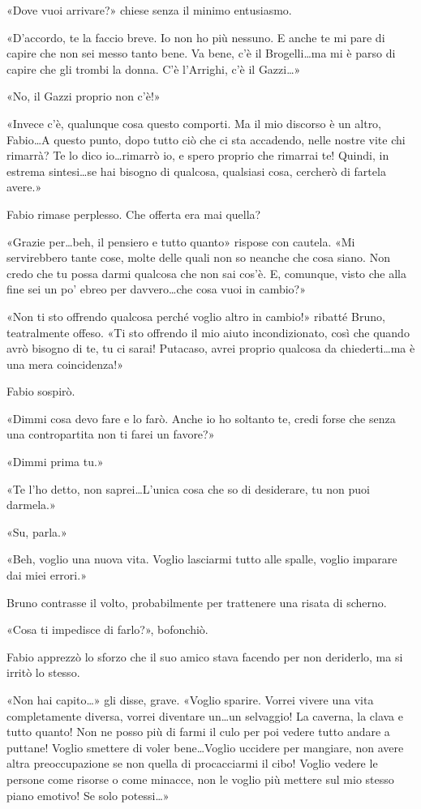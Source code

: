 «Dove vuoi arrivare?» chiese senza il minimo entusiasmo.

«D'accordo, te la faccio breve. Io non ho più nessuno. E anche te mi pare di capire che non sei messo tanto bene. Va bene, c'è il Brogelli\ldots ma mi è parso di capire che gli trombi la donna. C'è l'Arrighi, c'è il Gazzi\ldots»

«No, il Gazzi proprio non c'è!»

«Invece c'è, qualunque cosa questo comporti. Ma il mio discorso è un altro, Fabio\ldots A questo punto, dopo tutto ciò che ci sta accadendo, nelle nostre vite chi rimarrà? Te lo dico io\ldots rimarrò io, e spero proprio che rimarrai te! Quindi, in estrema sintesi\ldots se hai bisogno di qualcosa, qualsiasi cosa, cercherò di fartela avere.»

Fabio rimase perplesso. Che offerta era mai quella?

«Grazie per\ldots beh, il pensiero e tutto quanto» rispose con cautela. «Mi servirebbero tante cose, molte delle quali non so neanche che cosa siano. Non credo che tu possa darmi qualcosa che non sai cos'è. E, comunque, visto che alla fine sei un po' ebreo per davvero\ldots che cosa vuoi in cambio?»

«Non ti sto offrendo qualcosa perché voglio altro in cambio!» ribatté Bruno, teatralmente offeso. «Ti sto offrendo il mio aiuto incondizionato, così che quando avrò bisogno di te, tu ci sarai! Putacaso, avrei proprio qualcosa da chiederti\ldots ma è una mera coincidenza!»

Fabio sospirò.

«Dimmi cosa devo fare e lo farò. Anche io ho soltanto te, credi forse che senza una contropartita non ti farei un favore?»

«Dimmi prima tu.»

«Te l'ho detto, non saprei\ldots L'unica cosa che so di desiderare, tu non puoi darmela.»

«Su, parla.»

«Beh, voglio una nuova vita. Voglio lasciarmi tutto alle spalle, voglio imparare dai miei errori.»

Bruno contrasse il volto, probabilmente per trattenere una risata di scherno.

«Cosa ti impedisce di farlo?», bofonchiò.

Fabio apprezzò lo sforzo che il suo amico stava facendo per non deriderlo, ma si irritò lo stesso.

«Non hai capito\ldots» gli disse, grave. «Voglio sparire. Vorrei vivere una vita completamente diversa, vorrei diventare un\ldots un selvaggio! La caverna, la clava e tutto quanto! Non ne posso più di farmi il culo per poi vedere tutto andare a puttane! Voglio smettere di voler bene\ldots Voglio uccidere per mangiare, non avere altra preoccupazione se non quella di procacciarmi il cibo! Voglio vedere le persone come risorse o come minacce, non le voglio più mettere sul mio stesso piano emotivo! Se solo potessi\ldots»

